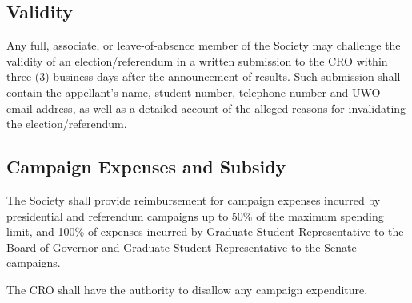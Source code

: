 \subsection{Validity}

\begin{longenum}[ label*=\thesubsection.\arabic*., align=left]
	\item Any full, associate, or leave-of-absence member of the Society may challenge the validity of an election/referendum in a written submission to the CRO within three (3) business days after the announcement of results. Such submission shall contain the appellant's name, student number, telephone number and UWO email address, as well as a detailed account of the alleged reasons for invalidating the election/referendum.
	
\end{longenum}

\subsection{Campaign Expenses and Subsidy}

\begin{longenum}[ label*=\thesubsection.\arabic*., align=left]
	\item The Society shall provide reimbursement for campaign expenses incurred by
presidential and referendum campaigns up to 50\% of the maximum spending limit, and 100\% of expenses incurred by Graduate Student Representative to the Board of Governor and Graduate Student Representative to the Senate campaigns.
    \item The CRO shall have the authority to disallow any campaign expenditure. 
\end{longenum}